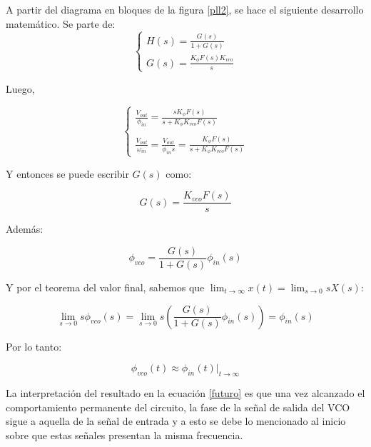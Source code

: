 A partir del diagrama en bloques de la figura \ref{pll2}, se hace el siguiente desarrollo matem\'atico. Se parte de:
\begin{equation}
	\begin{cases}
		H(s) = \frac{G(s)}{1+G(s)}\\
		G(s) = \frac{K_{\phi}F(s)K_{vco}}{s}
	\end{cases}
\end{equation}

Luego, 

\begin{equation}
\begin{cases}
	\frac{V_{out}}{\phi_{in}} = \frac{sK_{\phi}F(s)}{s+K_{\phi}K_{vco}F(s)}\\ \\
	\frac{V_{out}}{\omega_{in}}=\frac{V_{out}}{\phi_{in}s} = \frac{K_{\phi}F(s)}{s+K_{\phi}K_{vco}F(s)}
	\end{cases}
	\label{transf}
\end{equation}

Y entonces se puede escribir $G(s)$ como:

\begin{equation}
	G(s) = \frac{K_{vco}F(s)}{s}
\end{equation}
	
Adem\'as:

\begin{equation}
	\phi_{vco} = \frac{G(s)}{1+G(s)}\phi_{in}(s)
\end{equation}

Y por el teorema del valor final, sabemos que $\lim_{t\rightarrow\infty}{x(t)} = \lim_{s\rightarrow0}{sX(s)}$:

\begin{equation}
	\lim_{s\rightarrow0}{s\phi_{vco}(s)} = \lim_{s\rightarrow0}{s\left( \frac{G(s)}{1 + G(s)}\phi_{in}(s) \right)} = \phi_{in} (s)
\end{equation}

Por lo tanto:

\begin{equation}
	\phi_{vco}(t) \approx \phi_{in}(t)|_{t\to\infty} 
	\label{futuro}
\end{equation}

La interpretaci\'on del resultado en la ecuaci\'on \ref{futuro} es que una vez alcanzado el comportamiento permanente del circuito, la fase de la señal de salida del VCO sigue a aquella de la señal de entrada y a esto se debe lo mencionado al inicio sobre que estas señales presentan la misma frecuencia.


